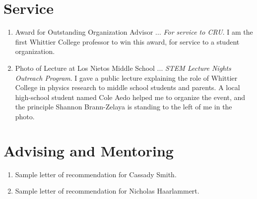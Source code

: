 \documentclass[../../main.tex]{subfiles}
\begin{document}
\section{Service}

\begin{enumerate}
\item Award for Outstanding Organization Advisor ... \textit{For service to CRU}.  I am the first Whittier College professor to win this award, for service to a student organization.
\item Photo of Lecture at Los Nietos Middle School ... \textit{STEM Lecture Nights Outreach Program}.  I gave a public lecture explaining the role of Whittier College in physics research to middle school students and parents.  A local high-school student named Cole Aedo helped me to organize the event, and the principle Shannon Brann-Zelaya is standing to the left of me in the photo.
\end{enumerate}

\section{Advising and Mentoring}

\begin{enumerate}
\item Sample letter of recommendation for Cassady Smith.
\item Sample letter of recommendation for Nicholas Haarlammert.
\end{enumerate}
\end{document}

